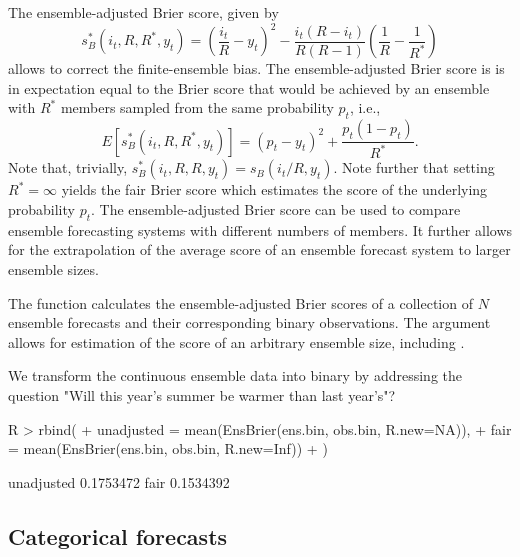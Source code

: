 \documentclass[article]{jss}
\begin{document}
The ensemble-adjusted Brier score, given by \citep{ferro2008effect}
%
\begin{equation}
s_{B}^*(i_t, R, R^*, y_t) = \left(\frac{i_t}{R} - y_t\right)^2 - \frac{i_t(R-i_t)}{R(R-1)}\left(\frac{1}{R} - \frac{1}{R^*}\right)
\label{eq:ens-brier}
\end{equation}
%
allows to correct the finite-ensemble bias.
The ensemble-adjusted Brier score is is in expectation equal to the Brier score that would be achieved by an ensemble with $R^*$ members sampled from the same probability $p_t$, i.e., 
%
\begin{equation}
E\left[s_{B}^*(i_t, R, R^*, y_t)\right] = (p_t - y_t)^2 + \frac{p_t(1-p_t)}{R^*}.
\end{equation}
%
Note that, trivially, $s_{B}^*(i_t, R, R, y_t) = s_{B}(i_t/R, y_t)$.
Note further that setting $R^*=\infty$ yields the fair Brier score \citep{ferro2013fair} which estimates the score of the underlying probability $p_t$.
The ensemble-adjusted Brier score can be used to compare ensemble forecasting systems with different numbers of members.
It further allows for the extrapolation of the average score of an ensemble forecast system to larger ensemble sizes.


The  function  calculates the ensemble-adjusted Brier scores of a collection of $N$ ensemble forecasts and their corresponding binary observations. 
The argument  allows for estimation of the score of an arbitrary ensemble size, including .


We transform the continuous ensemble data into binary by addressing the question "Will this year's summer be warmer than last year's"?

\begin{Schunk}
\begin{Sinput}
R > rbind(
+   unadjusted = mean(EnsBrier(ens.bin, obs.bin, R.new=NA)),
+   fair       = mean(EnsBrier(ens.bin, obs.bin, R.new=Inf))
+ )
\end{Sinput}
\begin{Soutput}
                [,1]
unadjusted 0.1753472
fair       0.1534392
\end{Soutput}
\end{Schunk}



\subsection{Categorical forecasts}
\end{document}
